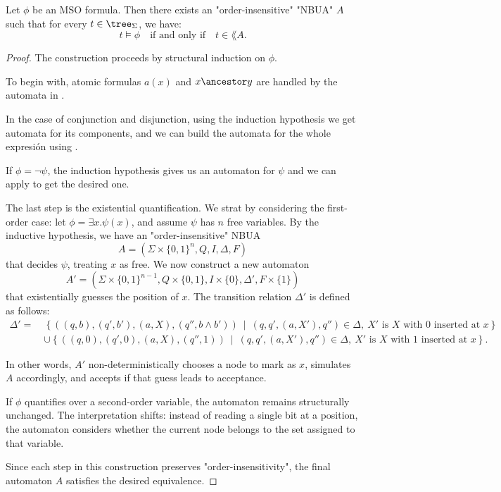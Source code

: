 \documentclass[a4paper,UKenglish,cleveref, autoref, thm-restate]{lipics-v2021}
\begin{document}
\begin{lemma}\label{lem:MSO-to-aut}
	Let $\phi$ be an MSO formula. Then there exists an "order-insensitive" "NBUA" $A$ such that for every $t \in \tree_\Sigma$, we have:
	\[
		t \models \phi \quad \text{if and only if} \quad t \in \lang{A}.
	\]
\end{lemma}

\begin{proof}
	The construction proceeds by structural induction on $\phi$.

	To begin with, atomic formulas $a(x)$ and $x \ancestor y$ are handled by the automata in .

	In the case of conjunction and disjunction, using the induction hypothesis we get automata for its components, and we
	can build the automata for the whole expresión using .


	If $\phi = \lnot \psi$, the induction hypothesis gives us an automaton for $\psi$ and we can apply 
	to get the desired one.

	The last step is the existential quantification. We strat by considering the first-order case: let $\phi = \exists x.\psi(x)$,
	and assume $\psi$ has $n$ free variables. By the inductive hypothesis, we have an "order-insensitive" NBUA
	\[
		A = (\Sigma \times \{0,1\}^n, Q, I, \Delta, F)
	\]
	that decides $\psi$, treating $x$ as free. We now construct a new automaton
	\[
		A' = (\Sigma \times \{0,1\}^{n-1}, Q \times \{0,1\}, I \times \{0\}, \Delta', F \times \{1\})
	\]
	that existentially guesses the position of $x$. The transition relation $\Delta'$ is defined as follows:
	\[
		\begin{aligned}
			\Delta' =\  & \left\{ ((q,b), (q',b'), (a, X), (q'', b \land b')) \ \middle|\
			(q, q', (a, X'), q'') \in \Delta,\ \text{$X'$ is $X$ with $0$ inserted at $x$} \right\} \\
			            & \cup \left\{ ((q,0), (q',0), (a, X), (q'',1)) \ \middle|\
			(q, q', (a, X'), q'') \in \Delta,\ \text{$X'$ is $X$ with $1$ inserted at $x$} \right\}.
		\end{aligned}
	\]

	In other words, $A'$ non-deterministically chooses a node to mark as $x$, simulates $A$ accordingly, and accepts if that guess leads to acceptance.

	If $\phi$ quantifies over a second-order variable, the automaton remains structurally unchanged. The interpretation shifts: instead of reading
	a single bit at a position, the automaton considers whether the current node belongs to the set assigned to that variable.

	Since each step in this construction preserves "order-insensitivity", the final automaton $A$ satisfies the desired equivalence.
\end{proof}
\end{document}
